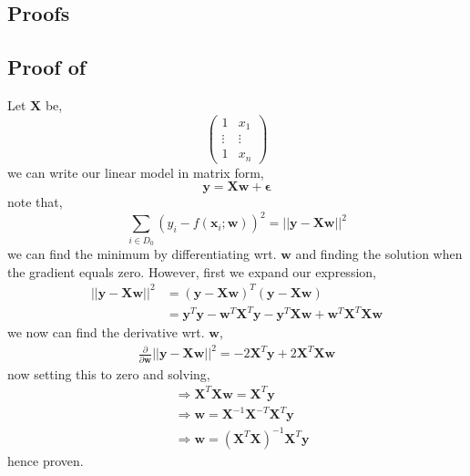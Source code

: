 \begin{appendices}
\section{Proofs}
\subsection{Proof of }
Let $\bm{X}$ be,
\begin{equation}
    \begin{pmatrix}
        1 & x_{1}\\
        \vdots & \vdots \\
        1 & x_{n}
    \end{pmatrix}
\end{equation}
we can write our linear model in matrix form,
\begin{equation}
    \bm{y} = \bm{Xw} + \bm{\epsilon}
\end{equation}
note that,
\begin{equation}
    \sum_{i \in D_{0}} (y_{i} - f(\bm{x}_{i};\bm{w}))^{2}
    = || \bm{y} - \bm{Xw}||^{2}
\end{equation}
we can find the minimum by differentiating wrt. $\bm{w}$ and finding the solution when the gradient equals zero. However, first we expand our expression,
\begin{align}
    || \bm{y} - \bm{Xw}||^{2} 
    {}& = (\bm{y} - \bm{Xw})^{T} (\bm{y}-\bm{Xw}) \\ 
    & = \bm{y}^{T}\bm{y} - \bm{w}^{T} \bm{X}^{T} \bm{y} - \bm{y}^{T}\bm{Xw} + \bm{w}^{T} \bm{X}^{T} \bm{Xw}
\end{align}
we now can find the derivative wrt. $\bm{w}$,
\begin{align}
    \frac{\partial}{\partial \bm{w}} ||\bm{y} - \bm{Xw}||^{2} = -2 \bm{X}^{T} \bm{y} + 2 \bm{X}^{T} \bm{X} \bm{w}
\end{align}
now setting this to zero and solving,
\begin{align}
    {}&\Rightarrow \bm{X}^{T} \bm{X} \bm{w} = \bm{X}^{T} \bm{y} \\
    & \Rightarrow \bm{w} = \bm{X}^{-1} \bm{X}^{-T} \bm{X}^{T} \bm{y} \\
    & \Rightarrow \bm{w} = (\bm{X}^{T} \bm{X})^{-1} \bm{X}^{T} \bm{y}
\end{align}
hence proven.
\end{appendices}